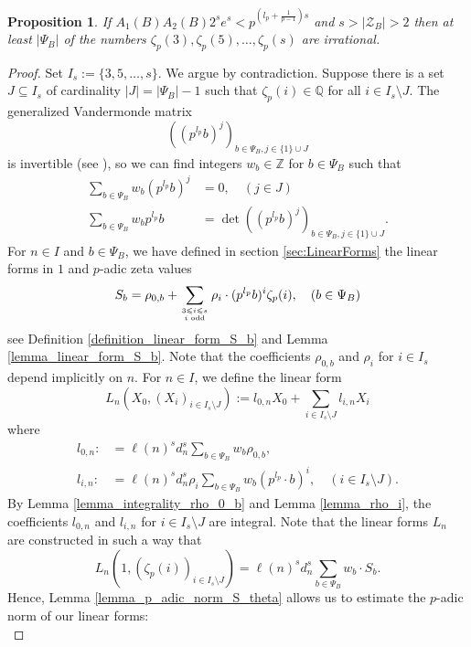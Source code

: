 \documentclass[12pt]{article}
\newtheorem{proposition}[theorem]{Proposition}
\numberwithin{equation}{section}
\begin{document}
\begin{proposition}\label{prop:elimination}
    If $A_1(B)A_2(B)2^se^s<p^{\left(l_p+\frac{1}{p-1}\right)s}$ and $s> |\mathcal{Z}_B|>2$ then at least $|\Psi_B|$ of the numbers $\zeta_p(3),\zeta_p(5),\dots,\zeta_p(s)$ are irrational.
\end{proposition}
\begin{proof}
    Set $I_s:=\{3,5,\dots,s\}$. We argue by contradiction. Suppose there is a set $J\subseteq I_s$ of cardinality $|J|=|\Psi_B|-1$ such that $\zeta_p(i)\in \mathbb{Q}$ for all $i\in I_s\setminus J$. The generalized Vandermonde matrix
    \[
        ((p^{l_p}b)^j)_{b\in \Psi_B, j\in \{1\}\cup J}
    \]
    is invertible (see \cite[Lemma 4]{FSZ2019}), so we can find integers $w_b\in \mathbb{Z}$ for $b\in \Psi_B$ such that
    \begin{align*}
        \sum_{b\in \Psi_B} w_b (p^{l_p}b)^j&=0,\quad (j \in J)\\
        \sum_{b\in \Psi_B} w_b p^{l_p}b &= \det ((p^{l_p}b)^j)_{b\in \Psi_B, j\in \{1\}\cup J}.
    \end{align*}
    For $n\in I$ and $b\in \Psi_B$, we have defined in section \ref{sec:LinearForms} the linear forms in $1$ and $p$-adic zeta values
    \[ S_b = \rho_{0,b} + \sum_{3 \leqslant i \leqslant s \atop i \text{~odd}} \rho_i \cdot (p^{l_p}b)^{i} \zeta_p(i),  \quad (b \in \Psi_B)\]
    see Definition \ref{definition_linear_form_S_b} and Lemma \ref{lemma_linear_form_S_b}. Note that the coefficients $\rho_{0,b}$ and $\rho_i$ for $i\in I_s$ depend implicitly on $n$.
    For $n\in I$, we define the linear form
    \[
        L_n(X_0,(X_i)_{i\in I_s\setminus J}):=l_{0,n}X_0+\sum_{i\in I_s\setminus J}l_{i,n}X_i
    \]
    where
    \begin{align*}
         l_{0,n}:&=\ell(n)^sd_n^s\sum_{b\in \Psi_B}w_b \rho_{0,b},\\
         l_{i,n}:&=\ell(n)^sd_n^s\rho_{i}\sum_{b\in \Psi_B}w_b(p^{l_p}\cdot b)^i, \quad (i\in I_s\setminus J).
    \end{align*}
    By Lemma \ref{lemma_integrality_rho_0_b} and Lemma \ref{lemma_rho_i}, the coefficients $l_{0,n}$ and $l_{i,n}$ for $i\in I_s\setminus J$ are integral. Note that the linear forms $L_n$ are constructed in such a way that
    \[
        L_n(1,(\zeta_p(i))_{i\in I_s\setminus J})=\ell(n)^sd_n^s\sum_{b\in \Psi_B} w_b \cdot S_b.
    \]
    Hence, Lemma \ref{lemma_p_adic_norm_S_theta} allows us to estimate the $p$-adic norm of our linear forms:
    \begin{equation}\label{eq:Sn_padic}

\end{equation}
\end{proof}
\end{document}
